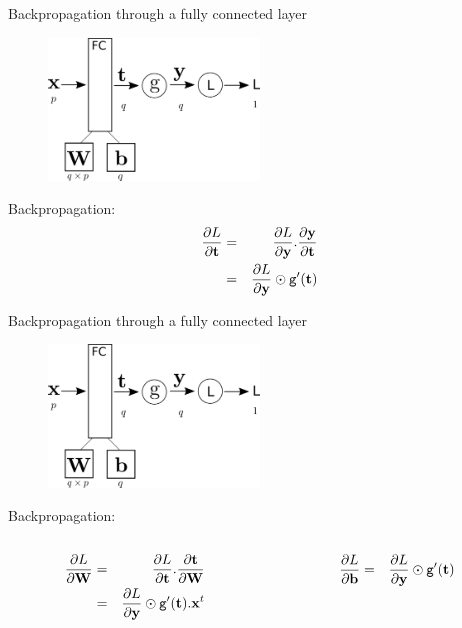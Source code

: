 \documentclass[xcolor=pdftex,dvipsnames,table,mathserif]{beamer}
\begin{document}
\begin{frame}{Backpropagation through a fully connected layer}
  \begin{figure}
    \includegraphics[width=0.5\textwidth]{bp_fc.png}
  \end{figure}

  Backpropagation:
  \begin{eqnarray*}
    \pdv{L}{\mathbf{t}} &=& \pdv{L}{\mathbf{y}}.\pdv{\mathbf{y}}{\mathbf{t}} \\
                           &=& \pdv{L}{\mathbf{y}} \odot \texttt{g}'(\mathbf{t}) \\
  \end{eqnarray*}

\end{frame}

\begin{frame}{Backpropagation through a fully connected layer}
  \begin{figure}
    \includegraphics[width=0.5\textwidth]{bp_fc.png}
  \end{figure}

  Backpropagation:
  \begin{columns}
    \begin{column}{.5\textwidth}
      \begin{eqnarray*}
        \pdv{L}{\mathbf{W}} &=& \pdv{L}{\mathbf{t}}.\pdv{\mathbf{t}}{\mathbf{W}} \\
                   &=& \pdv{L}{\mathbf{y}} \odot \texttt{g}'(\mathbf{t}).\mathbf{x}^t
      \end{eqnarray*}
    \end{column}

  \begin{column}{.5\textwidth}
  \begin{eqnarray*}
    \pdv{L}{\mathbf{b}} &=&  \pdv{L}{\mathbf{y}} \odot \texttt{g}'(\mathbf{t})
  \end{eqnarray*}
  \end{column}
\end{columns}


\end{frame}
\end{document}
